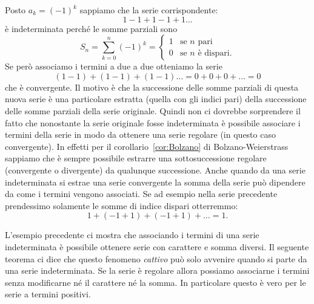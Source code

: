 \begin{example}
Posto $a_k = (-1)^k$ sappiamo che la serie corrispondente:
\[
  1 - 1 + 1 - 1 + 1 \dots
\]
è indeterminata perché le somme parziali sono
\[
  S_n = \sum_{k=0}^n (-1)^k
  = \begin{cases}
   1 & \text{se $n$ pari}\\
   0 & \text{se $n$ è dispari.}
  \end{cases}
\]
Se però associamo i termini a due a due otteniamo la serie
\[
  (1-1) + (1-1) + (1-1) \dots = 0 + 0 + 0 + \dots = 0
\]
che è convergente.
Il motivo è che la successione delle somme
parziali di questa nuova serie è una particolare estratta (quella
con gli indici pari) della successione delle somme parziali della
serie originale. Quindi non ci dovrebbe sorprendere il fatto che
nonostante la serie originale fosse indeterminata è possibile
associare i termini della serie in modo da ottenere una serie
regolare (in questo caso convergente).
In effetti per il corollario~\ref{cor:Bolzano} di Bolzano-Weierstrass
sappiamo che
è sempre possibile estrarre una sottosuccessione regolare (convergente o divergente)
da qualunque successione.
Anche quando da una serie indeterminata si estrae una serie
convergente la somma della serie può dipendere da come i termini
vengono associati.
Se ad esempio nella serie precedente prendessimo
solamente le somme di indice dispari
otterremmo:
\[
  1 + (-1+1) + (-1+1) + \dots = 1.
\]
\end{example}

L'esempio precedente ci mostra che associando i termini di una
serie indeterminata è possibile ottenere serie con carattere
e somma diversi.
Il seguente teorema ci dice che questo fenomeno \emph{cattivo}
può solo avvenire quando si parte da una serie indeterminata.
Se la serie è regolare allora possiamo associarne i termini
senza modificarne né il carattere né la somma.
In particolare questo è vero per le serie a termini positivi.

